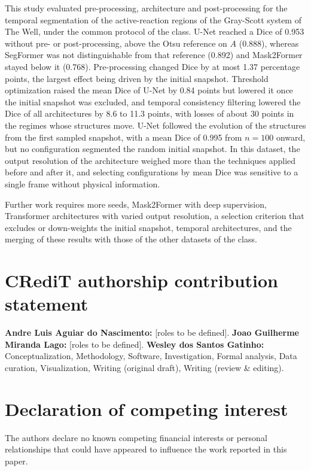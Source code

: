 \documentclass[final,5p,times,twocolumn]{elsarticle}
\begin{document}
This study evaluated pre-processing, architecture and post-processing for the temporal segmentation of the active-reaction regions of the Gray-Scott system of The Well, under the common protocol of the class. U-Net reached a Dice of 0.953 without pre- or post-processing, above the Otsu reference on $A$ (0.888), whereas SegFormer was not distinguishable from that reference (0.892) and Mask2Former stayed below it (0.768). Pre-processing changed Dice by at most 1.37 percentage points, the largest effect being driven by the initial snapshot. Threshold optimization raised the mean Dice of U-Net by 0.84 points but lowered it once the initial snapshot was excluded, and temporal consistency filtering lowered the Dice of all architectures by 8.6 to 11.3 points, with losses of about 30 points in the regimes whose structures move. U-Net followed the evolution of the structures from the first sampled snapshot, with a mean Dice of 0.995 from $n=100$ onward, but no configuration segmented the random initial snapshot. In this dataset, the output resolution of the architecture weighed more than the techniques applied before and after it, and selecting configurations by mean Dice was sensitive to a single frame without physical information.

Further work requires more seeds, Mask2Former with deep supervision, Transformer architectures with varied output resolution, a selection criterion that excludes or down-weights the initial snapshot, temporal architectures, and the merging of these results with those of the other datasets of the class.

\section*{CRediT authorship contribution statement}
\textbf{Andre Luis Aguiar do Nascimento:} [roles to be defined].
\textbf{Joao Guilherme Miranda Lago:} [roles to be defined].
\textbf{Wesley dos Santos Gatinho:} Conceptualization, Methodology, Software, Investigation, Formal analysis, Data curation, Visualization, Writing (original draft), Writing (review \& editing).

\section*{Declaration of competing interest}
The authors declare no known competing financial interests or personal relationships that could have appeared to influence the work reported in this paper.
\end{document}
